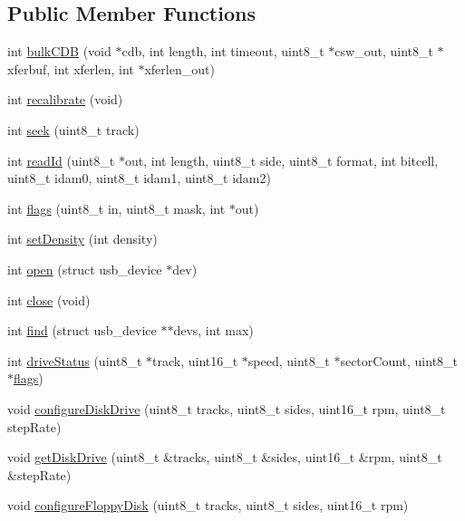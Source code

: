 \subsection*{Public Member Functions}
\begin{DoxyCompactItemize}
\item 
int \hyperlink{classFC5025_ac645d8e876d7121ca75db81ef99ee7f4}{bulk\+C\+D\+B} (void $\ast$cdb, int length, int timeout, uint8\+\_\+t $\ast$csw\+\_\+out, uint8\+\_\+t $\ast$xferbuf, int xferlen, int $\ast$xferlen\+\_\+out)
\item 
int \hyperlink{classFC5025_a867a0dfff92f111697ca74655bb42d26}{recalibrate} (void)
\item 
int \hyperlink{classFC5025_ab38385df803acdde0c55e472669ffc2d}{seek} (uint8\+\_\+t track)
\item 
int \hyperlink{classFC5025_aa796eca9259c5c1718e09184d94630a9}{read\+Id} (uint8\+\_\+t $\ast$out, int length, uint8\+\_\+t side, uint8\+\_\+t format, int bitcell, uint8\+\_\+t idam0, uint8\+\_\+t idam1, uint8\+\_\+t idam2)
\item 
int \hyperlink{classFC5025_a9c372002cbdc43034ed601f022e22751}{flags} (uint8\+\_\+t in, uint8\+\_\+t mask, int $\ast$out)
\item 
int \hyperlink{classFC5025_afff5293f6d1011a7b107607f544fedf5}{set\+Density} (int density)
\item 
int \hyperlink{classFC5025_a59d919ef113972193186371c7db7ee9d}{open} (struct usb\+\_\+device $\ast$dev)
\item 
int \hyperlink{classFC5025_a52c3aa7a28679f4afb203805f4c33510}{close} (void)
\item 
int \hyperlink{classFC5025_a644103f08f11ac57a1faf8710a3d7b4c}{find} (struct usb\+\_\+device $\ast$$\ast$devs, int max)
\item 
int \hyperlink{classFC5025_a178ad6a12a928f270db02fdbb463db95}{drive\+Status} (uint8\+\_\+t $\ast$track, uint16\+\_\+t $\ast$speed, uint8\+\_\+t $\ast$sector\+Count, uint8\+\_\+t $\ast$\hyperlink{classFC5025_a9c372002cbdc43034ed601f022e22751}{flags})
\item 
void \hyperlink{classFC5025_a794efc97b600cfa4e5c942458cdf3833}{configure\+Disk\+Drive} (uint8\+\_\+t tracks, uint8\+\_\+t sides, uint16\+\_\+t rpm, uint8\+\_\+t step\+Rate)
\item 
void \hyperlink{classFC5025_a2277f14f5c11732eeabff350d1aa3203}{get\+Disk\+Drive} (uint8\+\_\+t \&tracks, uint8\+\_\+t \&sides, uint16\+\_\+t \&rpm, uint8\+\_\+t \&step\+Rate)
\item 
void \hyperlink{classFC5025_af4a65dba5d2145adc0a0bb69d8ce6ae0}{configure\+Floppy\+Disk} (uint8\+\_\+t tracks, uint8\+\_\+t sides, uint16\+\_\+t rpm)
\end{DoxyCompactItemize}
